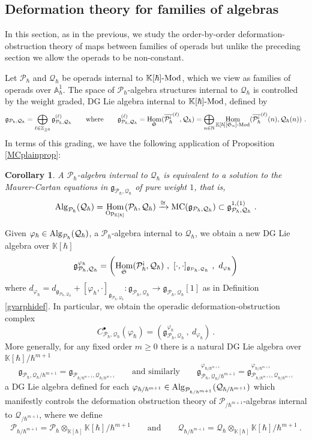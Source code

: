 \documentclass[11pt]{amsart}
\numberwithin{equation}{section}
\newtheorem{coro}[theo]{Corollary}
\theoremstyle{definition}
\newcommand{\bb}{\mathbb}
\newcommand{\mc}{\mathcal}
\newcommand{\mf}{\mathfrak}
\newcommand{\Ph}{{\mathcal{P}_\hbar}}
\newcommand{\Qh}{{\mathcal{Q}_\hbar}}
\newcommand{\gPQh}{{\mathfrak{g}_{\mc P_\hbar,\mc Q_\hbar}}}
\newcommand{\gPQvh}{{\mathfrak{g}^{\varphi_\hbar}_{\mc P_\hbar,\mc Q_\hbar}}}
\newcommand{\Phm}{{\mathcal{P}_{\hbar /\hbar^{m+1}}}}
\newcommand{\Qhm}{{\mathcal{Q}_{\hbar /\hbar^{m+1}}}}
\newcommand{\N}{{\mathbb{N}}}
\DeclareMathOperator{\Hom}{Hom}
\newcommand{\Mod}{{\textup{-Mod}}}
\newcommand{\K}{{\bb K}}
\newcommand{\ik}{{\bb K}}
\newcommand{\Alg}{{\textup{Alg}}}
\newcommand{\ash}{{\textup{\mbox{!`}}}}
\newcommand{\Op}{{\textup{Op}}}
\newcommand{\Ss}{{{\mf{S}}}}
\newcommand{\MC}{{{\textup{MC}}}}
\newcommand{\0}{{\textbf{0}}}
\newcommand{\Z}{\bb Z}
\newcommand{\g}{{\mf{g}}}
\def\IA{\mathbb{A}}
\def\QQ{{\mc Q}}
\def \mf{\mathfrak}
\def \Op{\mathrm{Op}}
\begin{document}
\subsection{Deformation theory for families of algebras}\label{deffamsec} 

In this section, as in the previous, we study the order-by-order deformation-obstruction theory of maps between families of operads but unlike the preceding section we allow the operads to be non-constant.



Let $\Ph$ and $\QQ_\hbar$ be operads internal to $\K[\hbar]\Mod$, which we view as families of operads over $\IA^1_\hbar$. The space of $\mc P_\hbar$-algebra structures internal to $\mc Q_\hbar$ is controlled by the weight graded, DG Lie algebra internal to $\ik[\hbar]\Mod$, defined by
\[  
\g_{\mc P_\hbar,\mc Q_\hbar}=\bigoplus_{\ell\in \Z_{\geq 0}}\g_{\mc P_\hbar,\mc Q_\hbar}^{(\ell)} \qquad\text{where}\qquad  \g_{\mc P_\hbar,\mc Q_\hbar}^{(\ell)}=\Hom_{\Ss}(\overline{\mc P^{\ash}_\hbar}^{ (\ell)} ,\mc Q_\hbar) =\bigoplus_{n\in \N} \Hom_{\K[\hbar][\Ss_n]\Mod}(\overline{\mc P^{\ash}_\hbar}^{ (\ell)}(n) ,\mc Q_\hbar(n))  \ .
\]
In terms of this grading, we have the following application of Proposition \ref{MCplainprop}:
\begin{coro}\label{MCplainhbarprop} 
A $\Ph$-algebra internal to $\Qh$ is equivalent to a solution to the Maurer-Cartan equations in $\gPQh$ of pure weight $1$, that is,
	\[ 
	\Alg_{\Ph}(\Qh) =\Hom_{\Op_{\K[\hbar]}}(\Ph, \Qh)  \xrightarrow{\cong } \MC(\g_{\Ph, \Qh}) \subset \g_{\Ph, \Qh}^{1 ,(1)} ~.
	\]
\end{coro}


Given $\varphi_\hbar \in  \Alg_{\Ph}(\Qh)$, a $\Ph$-algebra internal to $\Qh$, we obtain a new DG Lie algebra over $\K[\hbar]$
\[ \gPQvh =  \left( \Hom_{\Ss}(\mc P^\ash_\hbar ,\mc Q_\hbar) \ , \  [ \cdot , \cdot ]_{\gPQh}   \ , \  d_{\varphi_\hbar}  \right) \]
where $d_{\varphi_\hbar} =d_{\gPQh}+[\varphi_\hbar,\cdot]_{\gPQh}:\gPQh\to \gPQh[1]$ as in Definition \ref{gvarphidef}. In particular, we obtain the operadic deformation-obstruction complex
\[ C^\bullet_{\mc P_\hbar,\Qh} (\varphi_\hbar) = (\gPQvh \ , \ d_{\varphi_\hbar}) \ . \]
More generally, for any fixed order $m\geq 0$ there is a natural DG Lie algebra over $\K[\hbar]/\hbar^{m+1}$
\[ \g_{\Ph,\Qh /\hbar^{m+1}} = \g_{\Phm,\Qhm} \qquad \text{and similarly}\qquad \g_{\Ph,\Qh /\hbar^{m+1}}^{\varphi_{\hbar/\hbar^{m+1}}} = \g_{\Phm,\Qhm}^{\varphi_{\hbar/\hbar^{m+1}}}  \]
a DG Lie algebra defined for each $\varphi_{\hbar/\hbar^{m+1}}\in \Alg_{\Phm}(\Qhm)$
which manifestly controls the deformation obstruction theory of $\mc P_{ / \hbar^{m+1}}$-algebras internal to $\mc Q_{ / \hbar^{m+1}}$, where we define
\[ \Phm = \Ph\otimes_{\K[\hbar]} \K[\hbar]/\hbar^{m+1}\qquad \text{and} \qquad \Qhm = \Qh\otimes_{\K[\hbar]} \K[\hbar]/\hbar^{m+1}   \ . \]
\end{document}
